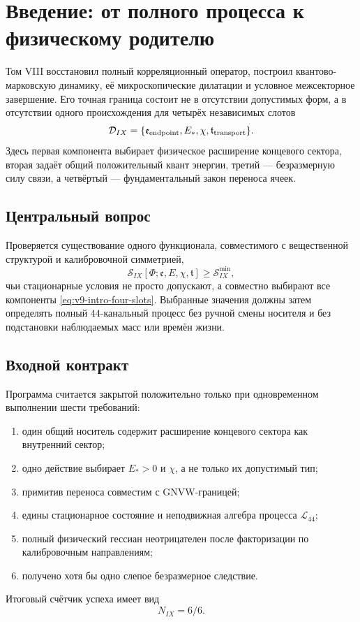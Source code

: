 \chapter{Введение: от полного процесса к физическому родителю}
\label{ch:v9-introduction}

Том VIII восстановил полный корреляционный оператор, построил
квантово-марковскую динамику, её микроскопические дилатации и условное
межсекторное завершение. Его точная граница состоит не в отсутствии
допустимых форм, а в отсутствии одного происхождения для четырёх независимых
слотов
\begin{equation}
 \mathcal D_{IX}=\{\mathfrak e_{\rm endpoint},E_*,\chi,
 \mathfrak t_{\rm transport}\}.
 \label{eq:v9-intro-four-slots}
\end{equation}
Здесь первая компонента выбирает физическое расширение концевого сектора, вторая задаёт
общий положительный квант энергии, третий --- безразмерную силу связи, а
четвёртый --- фундаментальный закон переноса ячеек.

\section{Центральный вопрос}

Проверяется существование одного функционала, совместимого с вещественной
структурой и калибровочной симметрией,
\begin{equation}
 \mathcal S_{IX}[\Phi;\mathfrak e,E,\chi,\mathfrak t]
 \geqslant \mathcal S_{IX}^{\min},
 \label{eq:v9-intro-parent}
\end{equation}
чьи стационарные условия не просто допускают, а совместно выбирают все
компоненты \eqref{eq:v9-intro-four-slots}. Выбранные значения должны затем
определять полный $44$-канальный процесс без ручной смены носителя и без
подстановки наблюдаемых масс или времён жизни.

\section{Входной контракт}

Программа считается закрытой положительно только при одновременном
выполнении шести требований:
\begin{enumerate}
 \item один общий носитель содержит расширение концевого сектора как внутренний сектор;
 \item одно действие выбирает $E_*>0$ и $\chi$, а не только их допустимый тип;
 \item примитив переноса совместим с GNVW-границей;
 \item едины стационарное состояние и неподвижная алгебра процесса $\mathcal L_{44}$;
 \item полный физический гессиан неотрицателен после факторизации по
 калибровочным направлениям;
 \item получено хотя бы одно слепое безразмерное следствие.
\end{enumerate}
Итоговый счётчик успеха имеет вид
\begin{equation}
 N_{IX}=6/6.
 \label{eq:v9-intro-success-ledger}
\end{equation}

